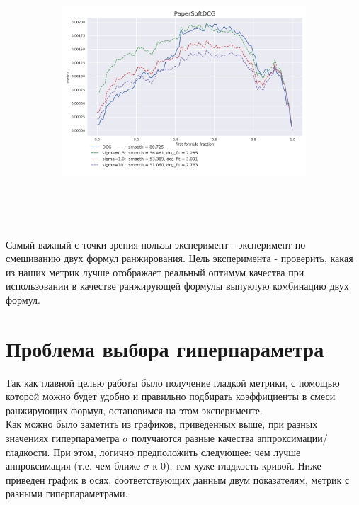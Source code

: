 \documentclass[14pt,a4paper]{amsart}
\theoremstyle{definition}
\theoremstyle{definition}
\begin{document}
\begin{figure}[!h]
    \centering
    \begin{subfigure}{\textwidth}
    \centering
        \includegraphics[height=10cm, width=\textwidth]{paper_formula_mix}
     \end{subfigure}
\end{figure}

Самый важный с точки зрения пользы эксперимент - эксперимент по смешиванию двух формул ранжирования. Цель эксперимента - проверить, какая из наших метрик лучше отображает реальный оптимум качества при использовании в качестве ранжирующей формулы выпуклую комбинацию двух формул.



\newpage
\section{Проблема выбора гиперпараметра}

Так как главной целью работы было получение гладкой метрики, с помощью которой можно будет удобно и правильно подбирать коэффициенты в смеси ранжирующих формул, остановимся на этом эксперименте. \\

Как можно было заметить из графиков, приведенных выше, при разных значениях гиперпараметра $\sigma$ получаются разные качества аппроксимации/гладкости. При этом, логично предположить следующее: чем лучше аппроксимация (т.е. чем ближе $\sigma$ к 0), тем хуже гладкость кривой. Ниже приведен график в осях, соответствующих данным двум показателям, метрик с разными гиперпараметрами.
\end{document}
